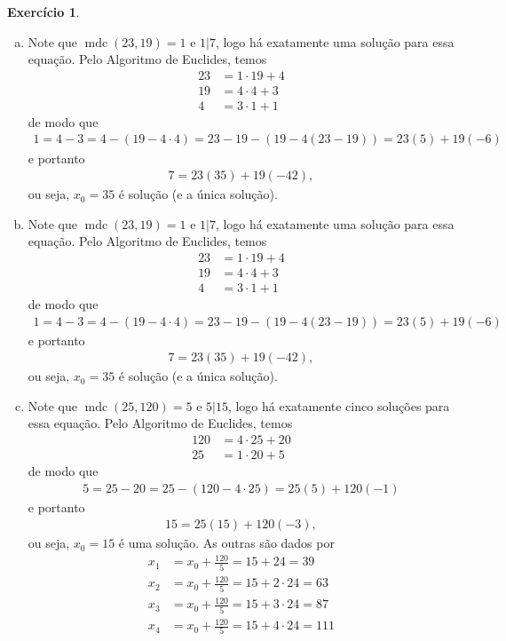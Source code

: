 \documentclass[a4paper,12pt]{article}
\DeclareMathOperator{\mdc}{mdc}
\theoremstyle{definition}
\newtheorem{exercise}{Exercício}%
\begin{document}
	\begin{exercise}
		\begin{enumerate}[(a)]
			\item Note que $\mdc(23,19) = 1$ e $1|7$, logo há exatamente uma solução para essa equação. Pelo Algoritmo de Euclides, temos
			\begin{align*}
			23 &= 1\cdot 19 + 4 \\
			19 &= 4\cdot 4 + 3 \\
			4 &= 3\cdot 1 + 1 
			\end{align*}
			de modo que
			\begin{align*}
			1 = 4 - 3 = 4 - (19 - 4\cdot 4) = 23 - 19 - (19 - 4(23 - 19)) = 23(5) + 19(-6)
			\end{align*}
			e portanto
			\begin{align*}
			7 = 23(35) + 19(-42),
			\end{align*}
			ou seja, $x_0 = 35$ é solução (e a única solução).
			\item Note que $\mdc(23,19) = 1$ e $1|7$, logo há exatamente uma solução para essa equação. Pelo Algoritmo de Euclides, temos
			\begin{align*}
			23 &= 1\cdot 19 + 4 \\
			19 &= 4\cdot 4 + 3 \\
			4 &= 3\cdot 1 + 1 
			\end{align*}
			de modo que
			\begin{align*}
			1 = 4 - 3 = 4 - (19 - 4\cdot 4) = 23 - 19 - (19 - 4(23 - 19)) = 23(5) + 19(-6)
			\end{align*}
			e portanto
			\begin{align*}
			7 = 23(35) + 19(-42),
			\end{align*}
			ou seja, $x_0 = 35$ é solução (e a única solução).
			\item Note que $\mdc(25,120) = 5$ e $5|15$, logo há exatamente cinco soluções para essa equação. Pelo Algoritmo de Euclides, temos
			\begin{align*}
			120 &= 4\cdot 25 + 20 \\
			25 &= 1\cdot 20 + 5  
			\end{align*}
			de modo que
			\begin{align*}
			5 = 25 - 20 = 25 - (120 - 4\cdot 25) = 25(5) + 120(-1)
			\end{align*}
			e portanto
			\begin{align*}
			15 = 25(15) + 120(-3),
			\end{align*}
			ou seja, $x_0 = 15$ é uma solução. As outras são dados por
			\begin{align*}
			x_1 &= x_0 + \frac{120}{5} = 15 + 24 = 39 \\
			x_2 &= x_0 + \frac{120}{5} = 15 + 2\cdot 24 = 63 \\
			x_3 &= x_0 + \frac{120}{5} = 15 + 3\cdot 24 = 87 \\
			x_4 &= x_0 + \frac{120}{5} = 15 + 4\cdot 24 = 111 \\ 
			\end{align*}
		\end{enumerate}
	\end{exercise}
	
	
	
	
	
\end{document}
